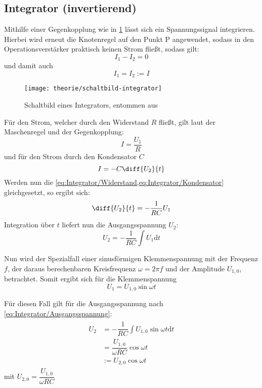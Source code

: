 \subsection{Integrator (invertierend)}
Mithilfe einer Gegenkopplung wie in \cref{fig:Theorie/integrator} lässt sich
ein Spannungssignal integrieren. Hierbei wird erneut die Knotenregel auf den
Punkt P angewendet, sodass in den Operationsverstärker praktisch keinen Strom
fließt, sodass gilt:
\begin{equation}
	I_1 - I_2 = 0
\end{equation}
und damit auch
\begin{equation}
	I_1 = I_2 := I
\end{equation}

\begin{figure}[H]
	\centering
	\texttt{[image: theorie/schaltbild-integrator]}
	\caption{Schaltbild eines Integrators, entommen
	aus \cite{script}}
	\label{fig:Theorie/integrator}
\end{figure}

Für den Strom, welcher durch den Widerstand $R$ fließt, gilt laut der 
Maschenregel und der Gegenkopplung:
\begin{equation}\label{eq:Integrator/Widerstand}
	I = \dfrac{U_1}{R}
\end{equation}
und für den Strom durch den Kondensator $C$
\begin{equation}\label{eq:Integrator/Kondensator}
	I = -C \diff{U_2}{t}
\end{equation}
Werden nun die \cref{eq:Integrator/Widerstand,eq:Integrator/Kondensator} 
gleichgesetzt, so ergibt sich:
\begin{equation}
	\diff{U_2}{t} = - \dfrac{1}{RC} U_1
\end{equation}
Integration über $t$ liefert nun die Ausgangsspannung $U_2$:
\begin{equation}\label{eq:Integrator/Ausgangsspannung}
	U_2 = - \dfrac{1}{RC} \int U_1 \mathrm{d}t
\end{equation}

Nun wird der Spezialfall einer sinusförmigen Klemmenspannung mit der Frequenz
$f$, der daraus berechenbaren Kreisfrequenz $\omega = 2 \pi f$ und der Amplitude
$U_{1,0}$, betrachtet. Somit ergibt sich für die Klemmenspannung
\begin{equation}
	U_1 = U_{1,0} \sin \omega t
\end{equation}

Für diesen Fall gilt für die Ausgangsspannung nach 
\cref{eq:Integrator/Ausgangsspannung}:
\begin{align}
	\begin{split}
		U_2 &= - \dfrac{1}{RC} \int U_{1,0} \sin \omega t \mathrm{d}t \\
		&= \dfrac{U_{1,0}}{\omega R C} \cos \omega t \\
		&:= U_{2,0} \cos \omega t
	\end{split}
\end{align}
mit $U_{2,0} = \dfrac{U_{1,0}}{\omega R C}$

